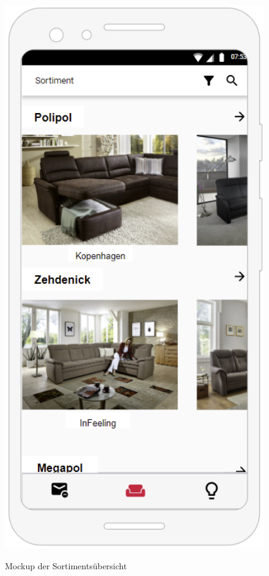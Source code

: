 \begin{figure}[!htb]
    \centering
    \begin{minipage}[t]{.4\textwidth}
        \caption{Mockup der Sortimentsübersicht}
        \includegraphics[width=1\textwidth]{img/Mockup_Sortiment.PNG}\\

\end{minipage}
\end{figure}
